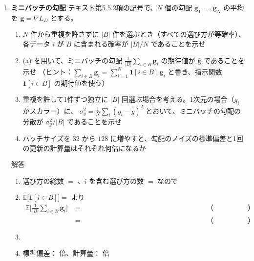 \documentclass[a4paper,dvipdfmx]{jsarticle}
\newcommand{\提出期限}{2026年11月9日（月）}
\newcommand{\学籍番号}{0000000}
\newcommand{\氏名}{氏名を書く}
\newcommand{\提出日}{2026年11月9日}
\newenvironment{answer}{\begin{itembox}[l]{解答}}{\end{itembox}}
\begin{document}
\begin{enumerate}
  \item \textbf{ミニバッチの勾配}\quad
    テキスト第5.5.2項の記号で、$N$ 個の勾配 $\bm{g}_1, \ldots, \bm{g}_N$ の平均を $\bar{\bm{g}} = \nabla L_D$ とする。
    \begin{enumerate}
      \item $N$ 件から重複を許さずに $|B|$ 件を選ぶとき（すべての選び方が等確率）、各データ $i$ が $B$ に含まれる確率が $|B|/N$ であることを示せ
      \item (a) を用いて、ミニバッチの勾配 $\frac{1}{|B|}\sum_{i \in B}\bm{g}_i$ の期待値が $\bar{\bm{g}}$ であることを示せ
        （ヒント：$\sum_{i \in B}\bm{g}_i = \sum_{i=1}^N \bm{1}[i \in B]\,\bm{g}_i$ と書き、指示関数 $\bm{1}[i \in B]$ の期待値を使う）
      \item 重複を許して1件ずつ独立に $|B|$ 回選ぶ場合を考える。1次元の場合（$g_i$ がスカラー）に、
        $\sigma_g^2 = \frac{1}{N}\sum_i (g_i - \bar{g})^2$ とおいて、ミニバッチの勾配の分散が $\sigma_g^2/|B|$ であることを示せ
      \item バッチサイズを $32$ から $128$ に増やすと、勾配のノイズの標準偏差と1回の更新の計算量はそれぞれ何倍になるか
    \end{enumerate}
    \begin{answer}
      \begin{enumerate}
        \item 選び方の総数 $= $ \phantom{XXXXXX}、$i$ を含む選び方の数 $= $ \phantom{XXXXXX} なので
          \vspace{8mm}
        \item $\mathbb{E}\big[\bm{1}[i \in B]\big] = $ \phantom{XXXX} より
          \begin{align*}
            \mathbb{E}\Big[\frac{1}{|B|}\sum_{i \in B}\bm{g}_i\Big]
              &= \phantom{XXXXXXXXXXXXXXXXXXXX} && \text{（　　　　　）} \\
              &= \phantom{XXXXXXXXXXXXXXXXXXXX} && \text{（　　　　　）}
          \end{align*}
        \item
          \vspace{14mm}
        \item 標準偏差：\phantom{XXXX} 倍、計算量：\phantom{XXXX} 倍
          \vspace{2mm}
      \end{enumerate}
    \end{answer}


\end{enumerate}
\end{document}
